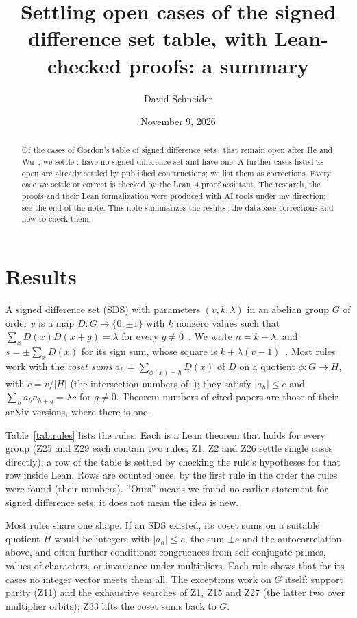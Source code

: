 \documentclass[11pt]{amsart}
\title[Open cases of the SDS table]{Settling open cases of the signed difference set table,
with Lean-checked proofs: a summary}
\author{David Schneider}
\date{November 9, 2026}
\begin{document}
\begin{abstract}
Of the \openAfterHeWu{} cases of Gordon's table of signed difference sets~\cite{gordon-db} that
remain open after He and Wu~\cite{he-wu}, we settle \ourRows: \ourNone{} have no signed difference set and \ourExists{} have
one. A further \corrections{} cases listed as open are already settled by published
constructions; we list them as corrections.
Every case we settle or correct is checked by the Lean~4 proof assistant. The research, the proofs and
their Lean formalization were produced with AI tools under my direction; see the end of the
note. This note summarizes the results, the database corrections and
how to check them.
\end{abstract}

\maketitle

\section{Results}

A signed difference set (SDS) with parameters $(v,k,\lambda)$ in an abelian group $G$ of
order $v$ is a map $D \colon G \to \{0, \pm 1\}$ with $k$ nonzero values such that
$\sum_x D(x) D(x+g) = \lambda$ for every $g \neq 0$~\cite{gordon}. We write $n = k - \lambda$,
and $s = \pm\sum_x D(x)$ for its sign sum, whose square is $k + \lambda(v-1)$~\cite[Lemma~1.1]{gordon}.
Most rules work with the \emph{coset sums} $a_h = \sum_{\phi(x) = h} D(x)$ of $D$ on a
quotient $\phi \colon G \to H$, with $c = v/|H|$ (the intersection numbers
of~\cite[Lemma~5.2]{gordon}); they satisfy $|a_h| \le c$ and $\sum_h a_h a_{h+g} = \lambda c$
for $g \neq 0$. Theorem numbers of cited papers are those of their arXiv versions, where there is one.

Table~\ref{tab:rules} lists the rules. Each is a Lean theorem that holds for every group (Z25
and Z29 each contain two rules; Z1, Z2 and Z26 settle single cases directly); a row of the table is
settled by checking the rule's hypotheses for that row inside Lean. Rows are counted once, by
the first rule in the order the rules were found (their numbers). ``Ours'' means we found no
earlier statement for signed difference sets; it does not mean the idea is new.

Most rules share one shape. If an SDS existed, its coset sums on a suitable quotient $H$ would be
integers with $|a_h| \le c$, the sum $\pm s$ and the autocorrelation above, and often further conditions:
congruences from self-conjugate primes, values of characters, or invariance under multipliers.
Each rule shows that for its cases no integer vector meets them all. The exceptions work on $G$
itself: support parity (Z11) and the exhaustive searches of Z1, Z15 and Z27 (the latter two
over multiplier orbits); Z33 lifts the coset sums back to $G$.
\end{document}
